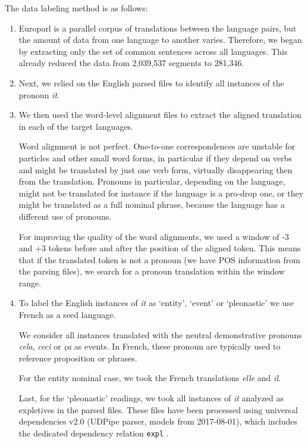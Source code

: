 \documentclass[10pt, a4paper]{article}
\begin{document}
The data labeling method is as follows:

\begin{enumerate}\setlength\itemsep{1em}

\item Europarl is a parallel corpus of translations
between the language pairs, but the amount of data from one language to another
varies. Therefore, we began by extracting only the set of common sentences
across all languages. This already reduced the data from 2,039,537 segments to
281,346. 

\item  Next, we relied on the English parsed files to
identify all instances of the pronoun \textit{it}.

\item We then used the word-level alignment files to
extract the aligned translation in each of the target languages.

Word alignment is not perfect. One-to-one correspondences are unstable for
particles and other small word forms, in particular if they depend on verbs and 
might be translated by just one verb form, virtually disappearing then from the
translation. Pronouns in particular, depending on the language, might not be
translated for instance if the language is a pro-drop one, or they might be
translated as a full nominal phrase, because the language has a different use of
pronouns.

For improving the quality of the word alignments, we used a window of -3 and
+3 tokens before and after the position of the aligned token. This means that if
the translated token is not a pronoun (we have POS information from the parsing
files), we search for a pronoun translation within the window range.

\item To label the English instances of \textit{it} as `entity', `event' or 
`pleonastic' we use French as a seed language.

We consider all instances 
translated with the neutral demonstrative pronouns \textit{cela}, \textit{ceci} or 
\textit{ça} as events. In French, these pronoun are typically used to reference 
proposition or phrases. 

For the entity nominal case, we took the French translations \textit{elle} and 
\textit{il}.

Last, for the `pleonastic' readings, we took all instances of \textit{it} analyzed 
as expletives in the parsed files. These files have been processed using universal 
dependencies v2.0 (UDPipe parser, models from 2017-08-01), which includes the 
dedicated dependency relation \texttt{expl} \cite{bouma-etal-2018-expletives}.


\end{enumerate}
\end{document}
